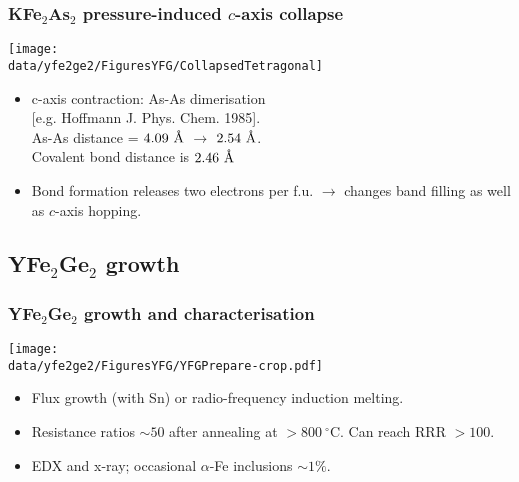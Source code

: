 \begin{frame}[label=CollapsedTetragonal]
\frametitle{KFe$_2$As$_2$ pressure-induced $c$-axis collapse}

\centerline{\texttt{[image: \\data/yfe2ge2/FiguresYFG/CollapsedTetragonal]}}

\begin{itemize}
\item 
c-axis contraction: As-As dimerisation \\
{\small [e.g. Hoffmann J. Phys. Chem. 1985].} \\
As-As distance = $4.09 ~\mbox{\AA}$ $\rightarrow$ $2.54
~\mbox{\AA}$. \\
 Covalent bond distance is $2.46 ~\mbox{\AA}$

\item
Bond formation releases two electrons per f.u. $\rightarrow$ changes band
filling as well as $c$-axis hopping.
\end{itemize}

\end{frame}



\subsection{YFe$_2$Ge$_2$ growth}
\begin{frame}[label=YFGPrep]
\frametitle{YFe$_2$Ge$_2$ growth and characterisation}

\centerline{\texttt{[image: \\data/yfe2ge2/FiguresYFG/YFGPrepare-crop.pdf]}}
\begin{itemize}
\item
Flux growth (with Sn) or radio-frequency induction melting. 
\item
Resistance ratios $\sim 50$ after annealing at $> 800 ~^\circ$C. Can reach
RRR $>100$.
\item 
EDX and x-ray; occasional $\alpha$-Fe inclusions $\sim 1\%$.
\end{itemize}
\end{frame}


